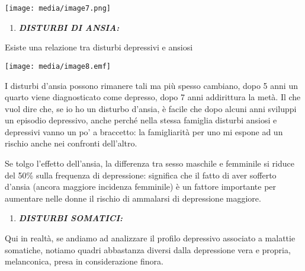 \documentclass[]{article}
\begin{document}
\texttt{[image: media/image7.png]}

\begin{enumerate}
\def\labelenumi{\arabic{enumi}.}
\item
  \textbf{\emph{DISTURBI DI ANSIA:}}
\end{enumerate}

Esiste una relazione tra disturbi depressivi e ansiosi

\texttt{[image: media/image8.emf]}

I disturbi d'ansia possono rimanere tali ma più spesso cambiano, dopo 5
anni un quarto viene diagnosticato come depresso, dopo 7 anni
addirittura la metà. Il che vuol dire che, se io ho un disturbo d'ansia,
è facile che dopo alcuni anni sviluppi un episodio depressivo, anche
perché nella stessa famiglia disturbi ansiosi e depressivi vanno un po'
a braccetto: la famigliarità per uno mi espone ad un rischio anche nei
confronti dell'altro.

Se tolgo l'effetto dell'ansia, la differenza tra sesso maschile e
femminile si riduce del 50\% sulla frequenza di depressione: significa
che il fatto di aver sofferto d'ansia (ancora maggiore incidenza
femminile) è un fattore importante per aumentare nelle donne il rischio
di ammalarsi di depressione maggiore.

\begin{enumerate}
\def\labelenumi{\arabic{enumi}.}
\item
  \textbf{\emph{DISTURBI SOMATICI:}}
\end{enumerate}

Qui in realtà, se andiamo ad analizzare il profilo depressivo associato
a malattie somatiche, notiamo quadri abbastanza diversi dalla
depressione vera e propria, melanconica, presa in considerazione finora.
\end{document}
